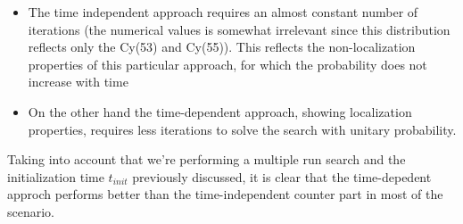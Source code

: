         \begin{itemize}
            \item The time independent approach requires an almost constant number of iterations (the numerical values is somewhat irrelevant since this distribution reflects only the Cy(53) and Cy(55)). This reflects the non-localization properties of this particular approach, for which the probability does not increase with time
            \item On the other hand the time-dependent approach, showing localization properties, requires less iterations to solve the search with unitary probability.
        \end{itemize}
        Taking into account that we're performing a multiple run search and the initialization time $t_{init}$ previously discussed, it is clear that the time-depedent approch performs better than the time-independent counter part in most of the scenario.


